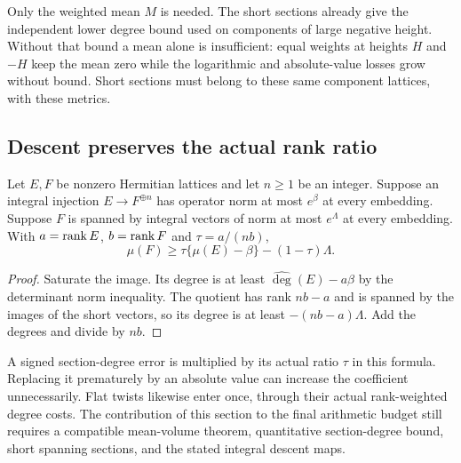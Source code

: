 Only the weighted mean $M$ is needed. The short sections already give
the independent lower degree bound used on components of large negative
height. Without that bound a mean alone is insufficient: equal weights
at heights $H$ and $-H$ keep the mean zero while the logarithmic and
absolute-value losses grow without bound. Short sections must belong
to these same component lattices, with these metrics.

\subsection{Descent preserves the actual rank ratio}

\begin{lemma}\label{rh-descent}
Let $E,F$ be nonzero Hermitian lattices and let $n\ge1$ be an integer.
Suppose an integral injection $E\to F^{\oplus n}$ has operator norm
at most $e^\beta$ at every embedding. Suppose $F$ is spanned by
integral vectors of norm at most $e^\Lambda$ at every embedding.
With $a=\operatorname{rank} E$, $b=\operatorname{rank} F$ and $\tau=a/(nb)$,
\[
                  \mu(F)\ge\tau\{\mu(E)-\beta\}
                                      -(1-\tau)\Lambda.
\]
\end{lemma}

\begin{proof}
Saturate the image. Its degree is at least
$\widehat{\deg}(E)-a\beta$ by the determinant norm inequality.
The quotient has rank $nb-a$ and is spanned by the images of the
short vectors, so its degree is at least $-(nb-a)\Lambda$.
Add the degrees and divide by $nb$.
\end{proof}

A signed section-degree error is multiplied by its actual ratio
$\tau$ in this formula. Replacing it prematurely by an absolute
value can increase the coefficient unnecessarily. Flat twists likewise
enter once, through their actual rank-weighted degree costs. The
contribution of this section to the final arithmetic budget still
requires a compatible mean-volume theorem, quantitative section-degree
bound, short spanning sections, and the stated integral descent maps.
